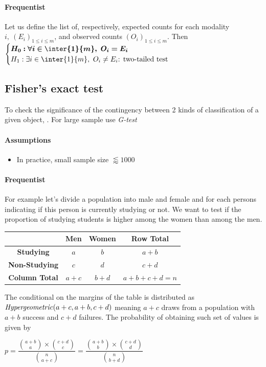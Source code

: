 \paragraph{Frequentist}
Let us define the list of, respectively, expected counts for each modality 
$i,~(E_{i})_{1\leq i\leq m}$, and observed counts $(O_{i})_{1\leq i\leq m}$.
Then
$\begin{cases}
    \bm{H_{0}: \forall i\in \inter{1}{m},~O_{i} = E_{i}}\\
    H_{1}: \exists i\in \inter{1}{m},~O_{i} \neq E_{i}\text{: two-tailed test} \\
\end{cases}$




\subsection{Fisher's exact test}
To check the significance of the contingency between 2 kinds of classification of a given
object, . For large sample use \emph{G-test}

\paragraph{Assumptions}
\begin{itemize}
    \item In practice, small sample size $\lessapprox 1000$
\end{itemize}

\paragraph{Frequentist}
For example let's divide a population into male and female and for each persons indicating
if this person is currently studying or not. We want to test if the proportion of studying
students is higher among the women than among the men.
\begin{center}
    \begin{tabular}{|*{4}{c|}}
    \hline
    & \textbf{Men} & \textbf{Women} & \textbf{Row Total}\\
    \hline
    \textbf{Studying} & $a$ & $b$ & $a+b$ \\
    \hline
    \textbf{Non-Studying} & $c$ & $d$ & $c+d$ \\
    \hline
    \textbf{Column Total} & $a+c$ & $b+d$ & $a + b + c + d = n$ \\
    \hline
    \end{tabular}
\end{center}
The conditional on the margins of the table is distributed as $\text{\emph{Hypergeometric}}(a+c, a+b, c+d)$ meaning $a + c$ draws from a population with $a + b$ success and $c+d$ 
failures.
The probability of obtaining such set of values is given by
\begin{center}
    $p = \dfrac{{{a+b}\choose{a}}\times{{c+d}\choose{c}}}{{{n}\choose{a+c}}}
    = \dfrac{{{a+b}\choose{b}}\times{{c+d}\choose{d}}}{{{n}\choose{b+d}}}$
\end{center}

